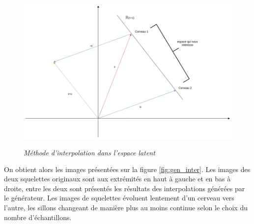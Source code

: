 \documentclass[12pt, oneside, a4paper, titlepage]{article}
\begin{document}
\begin{figure}[H]
    \centering
\includegraphics[width=13cm, height=8cm]{expl_ligne.png}
    \caption{\textit{Méthode d'interpolation dans l'espace latent}}
    \label{fig:expl1}
\end{figure}

On obtient alors les images présentées sur la figure \ref{fig:gen_inter}. Les images des deux squelettes originaux sont aux extrémités en haut à gauche et en bas à droite, entre les deux sont présentés les résultats des interpolations générées par le générateur. Les images de squelettes évoluent lentement d'un cerveau vers l'autre, les sillons changeant de manière plus au moins continue selon le choix du nombre d'échantillons.
\end{document}
